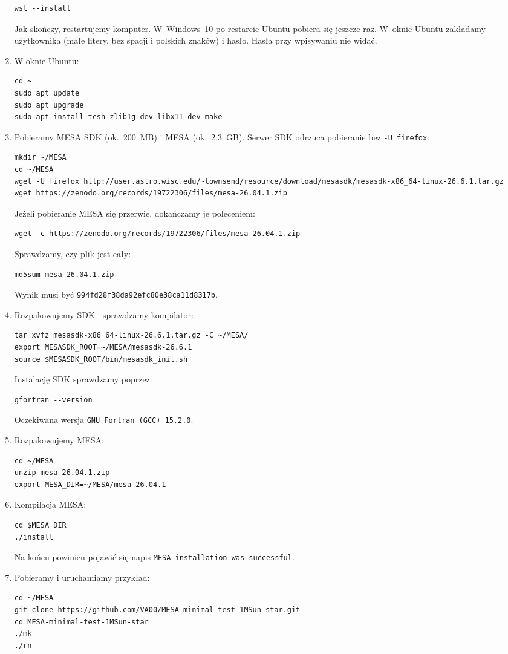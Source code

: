 \documentclass[11pt,a4paper]{article}
\begin{document}
\begin{enumerate}
\begin{verbatim}
wsl --install
\end{verbatim}
  Jak skończy, restartujemy komputer. W~Windows~10 po restarcie Ubuntu pobiera się jeszcze raz. W~oknie Ubuntu zakładamy użytkownika
  (małe litery, bez spacji i polskich znaków) i hasło. Hasła przy wpisywaniu nie widać.
\item W oknie Ubuntu:
\begin{verbatim}
cd ~
sudo apt update
sudo apt upgrade
sudo apt install tcsh zlib1g-dev libx11-dev make
\end{verbatim}
\item Pobieramy MESA SDK (ok.~200~MB) i MESA (ok.~2.3~GB). Serwer SDK odrzuca pobieranie bez \texttt{-U firefox}:
\begin{footnotesize}
\begin{verbatim}
mkdir ~/MESA
cd ~/MESA
wget -U firefox http://user.astro.wisc.edu/~townsend/resource/download/mesasdk/mesasdk-x86_64-linux-26.6.1.tar.gz
wget https://zenodo.org/records/19722306/files/mesa-26.04.1.zip
\end{verbatim}
\end{footnotesize}
  Jeżeli pobieranie MESA się przerwie, dokańczamy je poleceniem:
\begin{verbatim}
wget -c https://zenodo.org/records/19722306/files/mesa-26.04.1.zip
\end{verbatim}
  Sprawdzamy, czy plik jest cały:
\begin{verbatim}
md5sum mesa-26.04.1.zip
\end{verbatim}
  Wynik musi być \texttt{994fd28f38da92efc80e38ca11d8317b}.
\item Rozpakowujemy SDK i sprawdzamy kompilator:
\begin{verbatim}
tar xvfz mesasdk-x86_64-linux-26.6.1.tar.gz -C ~/MESA/
export MESASDK_ROOT=~/MESA/mesasdk-26.6.1
source $MESASDK_ROOT/bin/mesasdk_init.sh
\end{verbatim}
Instalację SDK sprawdzamy poprzez:
\begin{verbatim}
gfortran --version
\end{verbatim}
  Oczekiwana wersja \texttt{GNU Fortran (GCC) 15.2.0}.
\item Rozpakowujemy MESA:
\begin{verbatim}
cd ~/MESA
unzip mesa-26.04.1.zip
export MESA_DIR=~/MESA/mesa-26.04.1
\end{verbatim}
\item Kompilacja MESA:
\begin{verbatim}
cd $MESA_DIR
./install
\end{verbatim}
  Na końcu powinien pojawić się napis \texttt{MESA installation was successful}.
\item Pobieramy i uruchamiamy przykład:
\begin{verbatim}
cd ~/MESA
git clone https://github.com/VA00/MESA-minimal-test-1MSun-star.git
cd MESA-minimal-test-1MSun-star
./mk
./rn
\end{verbatim}
\end{enumerate}
\end{document}
